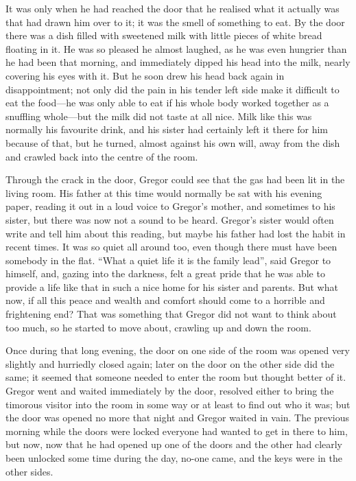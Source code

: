 It was only when he had reached the door that he realised what it
actually was that had drawn him over to it; it was the smell of
something to eat. By the door there was a dish filled with sweetened
milk with little pieces of white bread floating in it. He was so
pleased he almost laughed, as he was even hungrier than he had been
that morning, and immediately dipped his head into the milk, nearly
covering his eyes with it. But he soon drew his head back again in
disappointment; not only did the pain in his tender left side make it
difficult to eat the food—he was only able to eat if his whole body
worked together as a snuffling whole—but the milk did not taste at all
nice. Milk like this was normally his favourite drink, and his sister
had certainly left it there for him because of that, but he turned,
almost against his own will, away from the dish and crawled back into
the centre of the room.

Through the crack in the door, Gregor could see that the gas had been
lit in the living room. His father at this time would normally be sat
with his evening paper, reading it out in a loud voice to Gregor’s
mother, and sometimes to his sister, but there was now not a sound to
be heard. Gregor’s sister would often write and tell him about this
reading, but maybe his father had lost the habit in recent times. It
was so quiet all around too, even though there must have been somebody
in the flat. “What a quiet life it is the family lead”, said Gregor to
himself, and, gazing into the darkness, felt a great pride that he was
able to provide a life like that in such a nice home for his sister and
parents. But what now, if all this peace and wealth and comfort should
come to a horrible and frightening end? That was something that Gregor
did not want to think about too much, so he started to move about,
crawling up and down the room.

Once during that long evening, the door on one side of the room was
opened very slightly and hurriedly closed again; later on the door on
the other side did the same; it seemed that someone needed to enter the
room but thought better of it. Gregor went and waited immediately by
the door, resolved either to bring the timorous visitor into the room
in some way or at least to find out who it was; but the door was opened
no more that night and Gregor waited in vain. The previous morning
while the doors were locked everyone had wanted to get in there to him,
but now, now that he had opened up one of the doors and the other had
clearly been unlocked some time during the day, no-one came, and the
keys were in the other sides.

